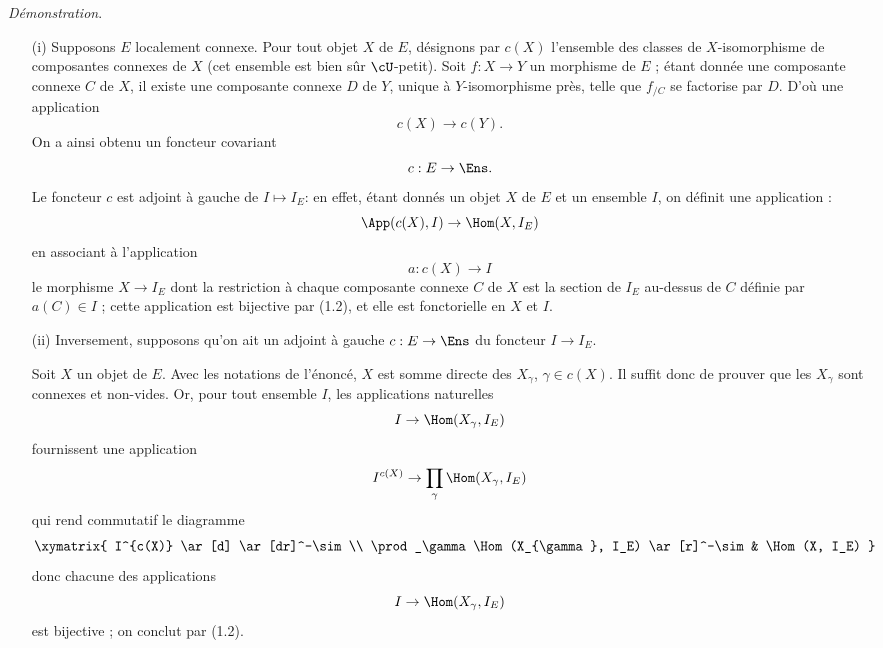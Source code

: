 {\it Démonstration}.
\begin{enumerate}
    \item[(i)] Supposons $E$ localement connexe. Pour tout objet $X$ de $E$, désignons par $c(X)$ l'ensemble des classes de $X$-isomorphisme de composantes connexes de $X$ (cet ensemble est bien sûr $\cU$-petit). Soit $f: X \to Y$ un morphisme de $E$ ; étant donnée une composante connexe $C$ de $X$, il existe une composante connexe $D$ de $Y$, unique à $Y$-isomorphisme près, telle que $f_{/C}$ se factorise par $D$. D'où une application
    $$
    c(X) \to c(Y).
    $$
    On a ainsi obtenu un foncteur covariant
    $$
    c: E \to \Ens.
    $$
    Le foncteur $c$ est adjoint à gauche de $I \mapsto I_E$: en effet, étant donnés un objet $X$ de $E$ et un ensemble $I$, on définit une application : 
    $$
    \App(c(X), I) \to \Hom(X, I_E)
    $$
    en associant à l'application
    $$
    a: c(X) \to I
    $$
    le morphisme $X \to I_E$ dont la restriction à chaque composante connexe $C$ de $X$ est la section de $I_E$ au-dessus de $C$ définie par $a(C) \in I$ ; cette application est bijective par (1.2), et elle est fonctorielle en $X$ et $I$.
    \item[(ii)] Inversement, supposons qu'on ait un adjoint à gauche $c: E \to \Ens$ du foncteur $I \to I_E$.
    
    Soit $X$ un objet de $E$. Avec les notations de l'énoncé, $X$ est somme directe des $X_{\gamma}$, $\gamma \in c(X)$. Il suffit donc de prouver que les $X_{\gamma}$ sont connexes et non-vides. Or, pour tout ensemble $I$, les applications naturelles
    $$
    I \to \Hom(X_{\gamma}, I_E)
    $$
    fournissent une application
    $$
    I^{c(X)} \to \prod_\gamma \Hom(X_{\gamma}, I_E)
    $$
    qui rend commutatif le diagramme
    \[
        \xymatrix{
        I^{c(X)} \ar[d] \ar[dr]^-\sim \\
        \prod_\gamma \Hom(X_{\gamma}, I_E) \ar[r]^-\sim & \Hom(X, I_E)
        }
    \]
    donc chacune des applications
    $$
    I \to \Hom(X_{\gamma}, I_E)
    $$
    est bijective ; on conclut par (1.2).
\end{enumerate}








